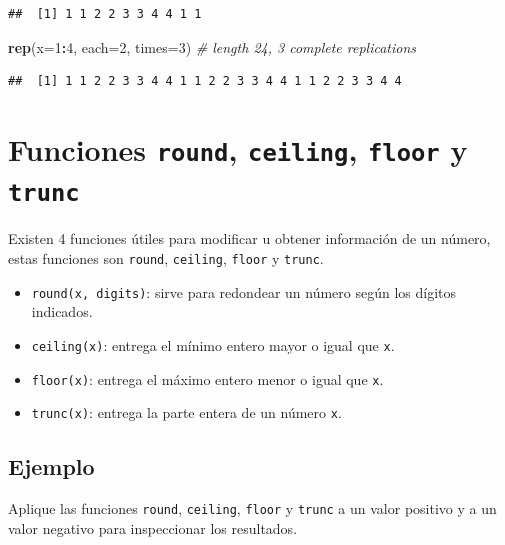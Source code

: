 \documentclass[10pt,]{krantz}
\makeatletter
\newenvironment{Shaded}{\begin{snugshade}}{\end{snugshade}}
\newcommand{\KeywordTok}[1]{\textcolor[rgb]{0.13,0.29,0.53}{\textbf{#1}}}
\newcommand{\DataTypeTok}[1]{\textcolor[rgb]{0.13,0.29,0.53}{#1}}
\newcommand{\DecValTok}[1]{\textcolor[rgb]{0.00,0.00,0.81}{#1}}
\newcommand{\CommentTok}[1]{\textcolor[rgb]{0.56,0.35,0.01}{\textit{#1}}}
\newcommand{\OperatorTok}[1]{\textcolor[rgb]{0.81,0.36,0.00}{\textbf{#1}}}
\newcommand{\NormalTok}[1]{#1}
\providecommand{\tightlist}{%
  \setlength{\itemsep}{0pt}\setlength{\parskip}{0pt}}
\newenvironment{kframe}{%
\medskip{}
\setlength{\fboxsep}{.8em}
 \def\at@end@of@kframe{}%
 \ifinner\ifhmode%
  \def\at@end@of@kframe{\end{minipage}}%
  \begin{minipage}{\columnwidth}%
 \fi\fi%
 \def\FrameCommand##1{\hskip\@totalleftmargin \hskip-\fboxsep
 \colorbox{shadecolor}{##1}\hskip-\fboxsep
     \hskip-\linewidth \hskip-\@totalleftmargin \hskip\columnwidth}%
 \MakeFramed {\advance\hsize-\width
   \@totalleftmargin\z@ \linewidth\hsize
   \@setminipage}}%
 {\par\unskip\endMakeFramed%
 \at@end@of@kframe}
\renewenvironment{Shaded}{\begin{kframe}}{\end{kframe}}
\makeatother
\begin{document}
\begin{verbatim}
##  [1] 1 1 2 2 3 3 4 4 1 1
\end{verbatim}

\begin{Shaded}
\begin{Highlighting}[]
\KeywordTok{rep}\NormalTok{(}\DataTypeTok{x=}\DecValTok{1}\OperatorTok{:}\DecValTok{4}\NormalTok{, }\DataTypeTok{each=}\DecValTok{2}\NormalTok{, }\DataTypeTok{times=}\DecValTok{3}\NormalTok{)  }\CommentTok{# length 24, 3 complete replications}
\end{Highlighting}
\end{Shaded}

\begin{verbatim}
##  [1] 1 1 2 2 3 3 4 4 1 1 2 2 3 3 4 4 1 1 2 2 3 3 4 4
\end{verbatim}

\section{\texorpdfstring{Funciones \texttt{round}, \texttt{ceiling},
\texttt{floor} y \texttt{trunc}  
}{Funciones round, ceiling, floor y trunc    }}\label{funciones-round-ceiling-floor-y-trunc}

Existen 4 funciones útiles para modificar u obtener información de un
número, estas funciones son \texttt{round}, \texttt{ceiling},
\texttt{floor} y \texttt{trunc}.

\begin{itemize}
\tightlist
\item
  \texttt{round(x,\ digits)}: sirve para redondear un número según los
  dígitos indicados.
\item
  \texttt{ceiling(x)}: entrega el mínimo entero mayor o igual que
  \texttt{x}.
\item
  \texttt{floor(x)}: entrega el máximo entero menor o igual que
  \texttt{x}.
\item
  \texttt{trunc(x)}: entrega la parte entera de un número \texttt{x}.
\end{itemize}

\subsection*{Ejemplo}\label{ejemplo-13}


Aplique las funciones \texttt{round}, \texttt{ceiling}, \texttt{floor} y
\texttt{trunc} a un valor positivo y a un valor negativo para
inspeccionar los resultados.
\end{document}
